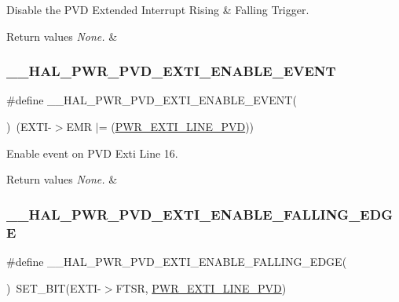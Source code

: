 Disable the P\+VD Extended Interrupt Rising \& Falling Trigger. 


\begin{DoxyRetVals}{Return values}
{\em None.} & \\
\hline
\end{DoxyRetVals}
\mbox{\label{group___p_w_r___exported___macro_gae5ba5672fe8cb7c1686c7f2cc211b128}} 
\subsubsection{\texorpdfstring{\_\_HAL\_PWR\_PVD\_EXTI\_ENABLE\_EVENT}{\_\_HAL\_PWR\_PVD\_EXTI\_ENABLE\_EVENT}}
{\footnotesize\ttfamily \#define \+\_\+\+\_\+\+H\+A\+L\+\_\+\+P\+W\+R\+\_\+\+P\+V\+D\+\_\+\+E\+X\+T\+I\+\_\+\+E\+N\+A\+B\+L\+E\+\_\+\+E\+V\+E\+NT(\begin{DoxyParamCaption}{ }\end{DoxyParamCaption})~(E\+X\+TI-\/$>$E\+MR $\vert$= (\mbox{\hyperlink{group___p_w_r___p_v_d___e_x_t_i___line_ga43a49255649e03d2d2b6b12c5c379d2b}{P\+W\+R\+\_\+\+E\+X\+T\+I\+\_\+\+L\+I\+N\+E\+\_\+\+P\+VD}}))}



Enable event on P\+VD Exti Line 16. 


\begin{DoxyRetVals}{Return values}
{\em None.} & \\
\hline
\end{DoxyRetVals}
\mbox{\label{group___p_w_r___exported___macro_ga5b971478563a00e1ee1a9d8ca8054e08}} 
\subsubsection{\texorpdfstring{\_\_HAL\_PWR\_PVD\_EXTI\_ENABLE\_FALLING\_EDGE}{\_\_HAL\_PWR\_PVD\_EXTI\_ENABLE\_FALLING\_EDGE}}
{\footnotesize\ttfamily \#define \+\_\+\+\_\+\+H\+A\+L\+\_\+\+P\+W\+R\+\_\+\+P\+V\+D\+\_\+\+E\+X\+T\+I\+\_\+\+E\+N\+A\+B\+L\+E\+\_\+\+F\+A\+L\+L\+I\+N\+G\+\_\+\+E\+D\+GE(\begin{DoxyParamCaption}{ }\end{DoxyParamCaption})~S\+E\+T\+\_\+\+B\+IT(E\+X\+TI-\/$>$F\+T\+SR, \mbox{\hyperlink{group___p_w_r___p_v_d___e_x_t_i___line_ga43a49255649e03d2d2b6b12c5c379d2b}{P\+W\+R\+\_\+\+E\+X\+T\+I\+\_\+\+L\+I\+N\+E\+\_\+\+P\+VD}})}



